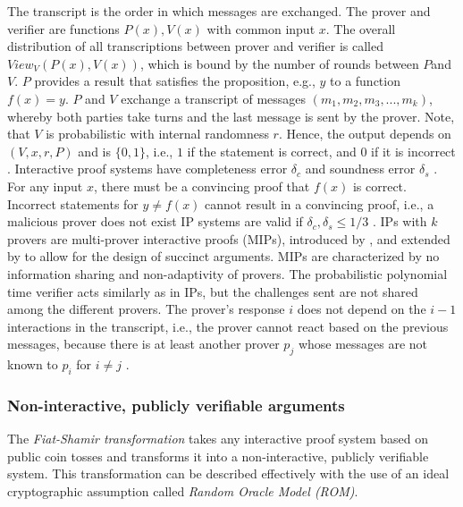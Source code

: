 The transcript is the order in which messages are exchanged. The prover and verifier are functions \(P(x), V(x)\) with common input \(x\). The overall distribution of all transcriptions between prover and verifier is called \(View_V(P(x), V(x))\), which is bound by the number of rounds between \(P\)and \(V\). \(P\) provides a result that satisfies the proposition, e.g., \(y\) to a function \(f(x) = y\). \(P\) and \(V\) exchange a transcript of messages \((m_1, m_2, m_3, ..., m_k)\), whereby both parties take turns and the last message is sent by the prover. Note, that \(V\) is probabilistic with internal randomness \(r\). Hence, the output depends on \((V, x, r, P)\) and is \(\{0,1\}\), i.e., \(1\) if the statement is correct, and \(0\) if it is incorrect \citep{GoldwasserIPs, BabaiIPs}. Interactive proof systems have completeness error \(\delta_c\) and soundness error \(\delta_s\) . For any input \(x\), there must be a convincing proof that \(f(x)\) is correct. Incorrect statements for \(y \neq f(x)\) cannot result in a convincing proof, i.e., a malicious prover does not exist IP systems are valid if \(\delta_c, \delta_s \leq 1/3\) \citep{Thaler}. IPs with \(k\) provers are multi-prover interactive proofs (MIPs), introduced by \citet{MIPsBen}, and extended by \citet{MIPsSetty} to allow for the design of succinct arguments. MIPs are characterized by no information sharing and non-adaptivity of provers. The probabilistic polynomial time verifier acts similarly as in IPs, but the challenges sent are not shared among the different provers. The prover's response \(i\) does not depend on the \(i-1\) interactions in the transcript, i.e., the prover cannot react based on the previous messages, because there is at least another prover \(p_j\) whose messages are not known to \(p_i\) for \(i\neq j\) .

\subsubsection{Non-interactive, publicly verifiable arguments}
The \textit{Fiat-Shamir transformation} takes any interactive proof system based on public coin tosses and transforms it into a non-interactive, publicly verifiable system. This transformation can be described effectively with the use of an ideal cryptographic assumption called \textit{Random Oracle Model (ROM)}. 
